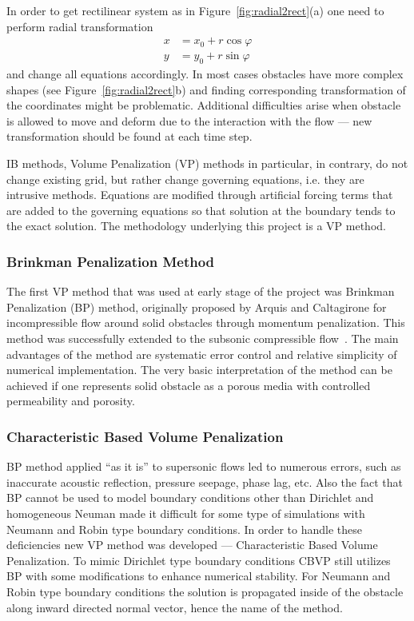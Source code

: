 In order to get rectilinear system as in Figure~\ref{fig:radial2rect}(a) one need to perform radial transformation
\begin{align*}
x &= x_0 + r\cos \varphi \\
y &= y_0 + r\sin \varphi
\end{align*}
and change all equations accordingly. In most cases obstacles have more complex shapes (see Figure~\ref{fig:radial2rect}b) and finding corresponding transformation of the coordinates might be problematic. Additional difficulties arise when obstacle is allowed to move and deform due to the interaction with the flow --- new transformation should be found at each time step.

IB methods, Volume Penalization (VP) methods in particular, in contrary, do not change existing grid, but rather change governing equations, i.e. they are intrusive methods. Equations are modified through artificial forcing terms that are added to the governing equations so that solution at the boundary tends to the exact solution. The methodology underlying this project is a VP method.
\subsubsection{Brinkman Penalization Method}
\label{sec:brinkman_penal_chapter1}
The first VP method that was used at early stage of the project was Brinkman Penalization (BP) method, originally proposed by Arquis and Caltagirone \cite{lib:vp_brink} for incompressible flow around solid obstacles through momentum penalization. This method was successfully extended to the subsonic compressible flow~\cite{lib:vp_liu}. The main advantages of the method are systematic error control and relative simplicity of numerical implementation. The very basic interpretation of the method can be achieved if one represents solid obstacle as a porous media with controlled permeability and porosity.

\subsubsection{Characteristic Based Volume Penalization}
BP method applied ``as it is'' to supersonic flows led to numerous errors, such as inaccurate acoustic reflection, pressure seepage, phase lag, etc. Also the fact that BP cannot be used to model boundary conditions other than Dirichlet and homogeneous Neuman made it difficult for some type of simulations with Neumann and Robin type boundary conditions. In order to handle these deficiencies new VP method was developed --- Characteristic Based Volume Penalization. To mimic Dirichlet type boundary conditions CBVP still utilizes BP with some modifications to enhance numerical stability. For Neumann and Robin type boundary conditions the solution is propagated inside of the obstacle along inward directed normal vector, hence the name of the method. 

